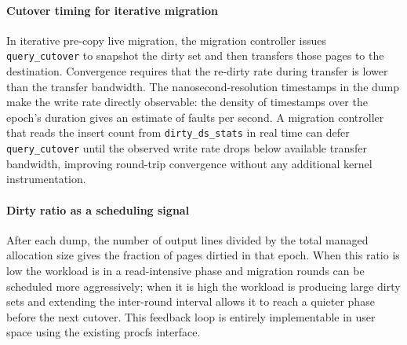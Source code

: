\paragraph{Cutover timing for iterative migration}
In iterative pre-copy live migration, the migration controller issues
\texttt{query\_cutover} to snapshot the dirty set and then transfers those
pages to the destination.
Convergence requires that the re-dirty rate during transfer is lower than the
transfer bandwidth.
The nanosecond-resolution timestamps in the dump make the write rate directly
observable: the density of timestamps over the epoch's duration gives an estimate
of faults per second.
A migration controller that reads the insert count from \texttt{dirty\_ds\_stats}
in real time can defer \texttt{query\_cutover} until the observed write rate
drops below available transfer bandwidth, improving round-trip convergence
without any additional kernel instrumentation.

\paragraph{Dirty ratio as a scheduling signal}
After each dump, the number of output lines divided by the total managed
allocation size gives the fraction of pages dirtied in that epoch.
When this ratio is low the workload is in a read-intensive phase and migration
rounds can be scheduled more aggressively; when it is high the workload is
producing large dirty sets and extending the inter-round interval allows it to
reach a quieter phase before the next cutover.
This feedback loop is entirely implementable in user space using the existing
procfs interface.

